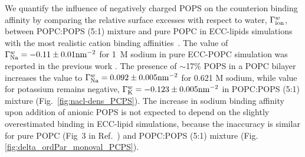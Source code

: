 \documentclass[journal=jctcce,manuscript=article]{achemso}
\begin{document}
We quantify the influence of negatively charged POPS on the counterion binding affinity
by comparing the relative surface excesses with respect to water, $\Gamma ^{w} _{\rm ion}$,
between POPC:POPS (5:1) mixture and pure POPC in ECC-lipids simulations with the most realistic
cation binding affinities~\cite{melcr18}.
The value of $\Gamma ^{w} _{\rm Na}=-0.11 \pm 0.01 \mathrm{nm}^{-2}$ for 1~M sodium in pure ECC-POPC
simulation was reported in the previous work \cite{melcr18}.
The presence of $\sim$17\% POPS in a POPC bilayer increases the
value to $\Gamma ^{w} _{\rm Na}=0.092 \pm 0.005 \mathrm{nm}^{-2}$ 
for 0.621 M sodium, while value for potassium remains negative,
$\Gamma ^{w} _{\rm K}=-0.123 \pm 0.005 \mathrm{nm}^{-2}$ in POPC:POPS (5:1) mixture (Fig.~\ref{fig:nacl-dens_PCPS}).
The increase in sodium binding affinity upon addition of anionic POPS is not expected to depend on
the slightly overestimated  binding in ECC-lipid simulations, because the
inaccuracy is similar for pure POPC (Fig~3 in Ref.~) and POPC:POPS (5:1) mixture (Fig. \ref{fig:delta_ordPar_monoval_PCPS}).
\end{document}
